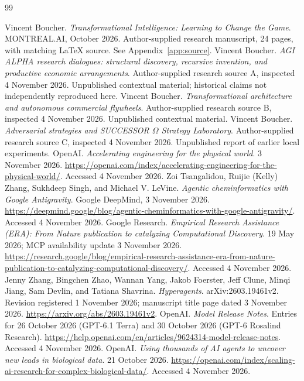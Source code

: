 \documentclass[11pt,letterpaper]{article}
\theoremstyle{remark}\newtheorem{remark}{Remark}[section]
\begin{document}
\clearpage
\begin{thebibliography}{99}
\small\raggedright
{} Vincent Boucher. \emph{Transformational Intelligence: Learning to Change the Game}. MONTREAL.AI, October 2026. Author-supplied research manuscript, 24 pages, with matching LaTeX source. See Appendix~\ref{app:source}.
 Vincent Boucher. \emph{AGI ALPHA research dialogues: structural discovery, recursive invention, and productive economic arrangements}. Author-supplied research source A, inspected 4 November 2026. Unpublished contextual material; historical claims not independently reproduced here.
 Vincent Boucher. \emph{Transformational architecture and autonomous commercial flywheels}. Author-supplied research source B, inspected 4 November 2026. Unpublished contextual material.
 Vincent Boucher. \emph{Adversarial strategies and SUCCESSOR $\Omega$ Strategy Laboratory}. Author-supplied research source C, inspected 4 November 2026. Unpublished report of earlier local experiments.
 OpenAI. \emph{Accelerating engineering for the physical world}. 3 November 2026. \url{https://openai.com/index/accelerating-engineering-for-the-physical-world/}. Accessed 4 November 2026.
 Zoi Tsangalidou, Ruijie (Kelly) Zhang, Sukhdeep Singh, and Michael V. LeVine. \emph{Agentic cheminformatics with Google Antigravity}. Google DeepMind, 3 November 2026. \url{https://deepmind.google/blog/agentic-cheminformatics-with-google-antigravity/}. Accessed 4 November 2026.
 Google Research. \emph{Empirical Research Assistance (ERA): From Nature publication to catalyzing Computational Discovery}. 19 May 2026; MCP availability update 3 November 2026. \url{https://research.google/blog/empirical-research-assistance-era-from-nature-publication-to-catalyzing-computational-discovery/}. Accessed 4 November 2026.
 Jenny Zhang, Bingchen Zhao, Wannan Yang, Jakob Foerster, Jeff Clune, Minqi Jiang, Sam Devlin, and Tatiana Shavrina. \emph{Hyperagents}. arXiv:2603.19461v2. Revision registered 1 November 2026; manuscript title page dated 3 November 2026. \url{https://arxiv.org/abs/2603.19461v2}.
 OpenAI. \emph{Model Release Notes}. Entries for 26 October 2026 (GPT-6.1 Terra) and 30 October 2026 (GPT-6 Rosalind Research). \url{https://help.openai.com/en/articles/9624314-model-release-notes}. Accessed 4 November 2026.
 OpenAI. \emph{Using thousands of AI agents to uncover new leads in biological data}. 21 October 2026. \url{https://openai.com/index/scaling-ai-research-for-complex-biological-data/}. Accessed 4 November 2026.

\end{thebibliography}
\end{document}
